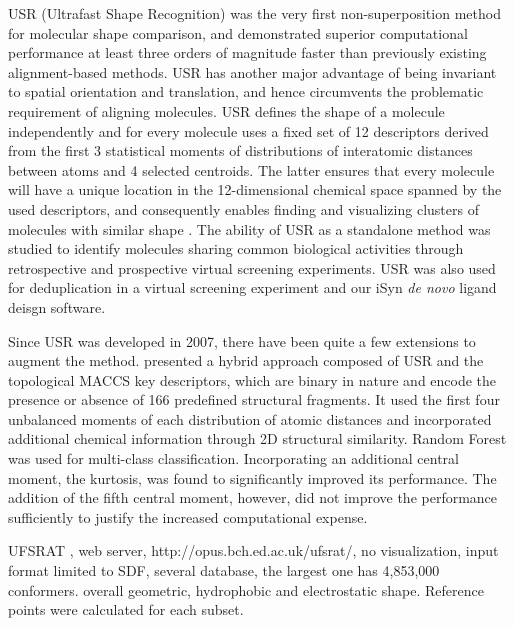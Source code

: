 USR (Ultrafast Shape Recognition) \citep{1379} was the very first non-superposition method for molecular shape comparison, and demonstrated superior computational performance at least three orders of magnitude faster than previously existing alignment-based methods. USR has another major advantage of being invariant to spatial orientation and translation, and hence circumvents the problematic requirement of aligning molecules. USR defines the shape of a molecule independently and for every molecule uses a fixed set of 12 descriptors derived from the first 3 statistical moments of distributions of interatomic distances between atoms and 4 selected centroids. The latter ensures that every molecule will have a unique location in the 12-dimensional chemical space spanned by the used descriptors, and consequently enables finding and visualizing clusters of molecules with similar shape \citep{1280}. The ability of USR as a standalone method was studied to identify molecules sharing common biological activities through retrospective \citep{1332} and prospective \citep{1380} virtual screening experiments. USR was also used for deduplication in a virtual screening experiment \citep{1390} and our iSyn \citep{1381,1387} \textit{de novo} ligand deisgn software.

Since USR was developed in 2007, there have been quite a few extensions \citep{1333,1334,1335,1337,1338,1331} to augment the method. \citep{1333} presented a hybrid approach composed of USR and the topological MACCS key descriptors, which are binary in nature and encode the presence or absence of 166 predefined structural fragments. It used the first four unbalanced moments of each distribution of atomic distances and incorporated additional chemical information through 2D structural similarity. Random Forest \citep{1310} was used for multi-class classification. Incorporating an additional central moment, the kurtosis, was found to significantly improved its performance. The addition of the fifth central moment, however, did not improve the performance sufficiently to justify the increased computational expense.

UFSRAT \citep{1436}, web server, http://opus.bch.ed.ac.uk/ufsrat/, no visualization, input format limited to SDF, several database, the largest one has 4,853,000 conformers. overall geometric, hydrophobic and electrostatic shape. Reference points were calculated for each subset.

